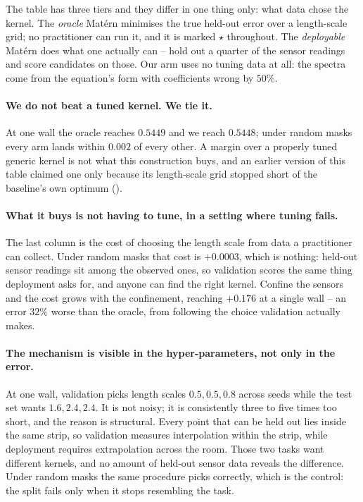 

The table has three tiers and they differ in one thing only: what data chose the
kernel.  The \emph{oracle} Mat\'ern minimises the true held-out error over a
length-scale grid; no practitioner can run it, and it is marked $\star$
throughout.  The \emph{deployable} Mat\'ern does what one actually can -- hold
out a quarter of the sensor readings and score candidates on those.  Our arm
uses no tuning data at all: the spectra come from the equation's form with
coefficients wrong by $50\%$.

\paragraph{We do not beat a tuned kernel.  We tie it.}
At one wall the oracle reaches $0.5449$ and we reach $0.5448$; under random masks
every arm lands within $0.002$ of every other.  A margin over a properly tuned
generic kernel is not what this construction buys, and an earlier version of this
table claimed one only because its length-scale grid stopped short of the
baseline's own optimum ().

\paragraph{What it buys is not having to tune, in a setting where tuning fails.}
The last column is the cost of choosing the length scale from data a practitioner
can collect.  Under random masks that cost is $+0.0003$, which is nothing:
held-out sensor readings sit among the observed ones, so validation scores the
same thing deployment asks for, and anyone can find the right kernel.  Confine
the sensors and the cost grows with the confinement, reaching $+0.176$ at a
single wall -- an error $32\%$ worse than the oracle, from following the choice
validation actually makes.

\paragraph{The mechanism is visible in the hyper-parameters, not only in the
error.}  At one wall, validation picks length scales $0.5, 0.5, 0.8$ across
seeds while the test set wants $1.6, 2.4, 2.4$.  It is not noisy; it is
consistently three to five times too short, and the reason is structural.  Every
point that can be held out lies inside the same strip, so validation measures
interpolation within the strip, while deployment requires extrapolation across
the room.  Those two tasks want different kernels, and no amount of held-out
sensor data reveals the difference.  Under random masks the same procedure picks
correctly, which is the control: the split fails only when it stops resembling
the task.

